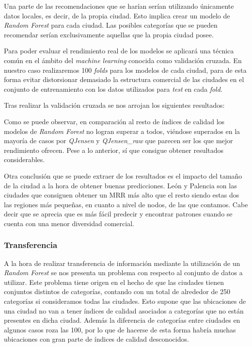 Una parte de las recomendaciones que se harían serían utilizando únicamente datos locales, es decir, de la propia ciudad. Esto implica crear un modelo de \textit{Random Forest} para cada ciudad. Las posibles categorías que se pueden recomendar serían exclusivamente aquellas que la propia ciudad posee.

Para poder evaluar el rendimiento real de los modelos se aplicará una técnica común en el ámbito del \textit{machine learning} conocida como validación cruzada. En nuestro caso realizaremos 100 \textit{folds} para los modelos de cada ciudad, para de esta forma evitar distorsionar demasiado la estructura comercial de las ciudades en el conjunto de entrenamiento con los datos utilizados para \textit{test} en cada \textit{fold}.

Tras realizar la validación cruzada se nos arrojan los siguientes resultados:



Como se puede observar, en comparación al resto de índices de calidad los modelos de \textit{Random Forest} no logran superar a todos, viéndose superados en la mayoría de casos por \textit{QJensen} y \textit{QJensen\_raw} que parecen ser los que mejor rendimiento ofrecen. Pese a lo anterior, sí que consigue obtener resultados considerables.

Otra conclusión que se puede extraer de los resultados es el impacto del tamaño de la ciudad a la hora de obtener buenas predicciones. León y Palencia son las ciudades que consiguen obtener un MRR más alto que el resto siendo estas dos las regiones más pequeñas, en cuanto a nivel de nodos, de las que contamos. Cabe decir que se aprecia que es más fácil predecir y encontrar patrones cuando se cuenta con una menor diversidad comercial.
\subsubsection{Transferencia}

A la hora de realizar transferencia de información mediante la utilización de un \textit{Random Forest} se nos presenta un problema con respecto al conjunto de datos a utilizar. Este problema tiene origen en el hecho de que las ciudades tienen conjuntos distintos de categorías, contando con un total de alrededor de 250 categorías si consideramos todas las ciudades. Esto supone que las ubicaciones de una ciudad no van a tener índices de calidad asociados a categorías que no están presentes en dicha ciudad. Además la diferencia de categorías entre ciudades en algunos casos roza las 100, por lo que de hacerse de esta forma habría muchas ubicaciones con gran parte de índices de calidad desconocidos.

